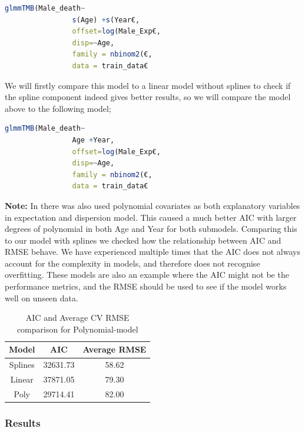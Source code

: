 \documentclass[12pt, twoside,hidelinks]{article}
\theoremstyle{definition}
\numberwithin{equation}{section}
\begin{document}
\begin{lstlisting}[language=R]
glmmTMB(Male_death~ 
                s(Age) +s(Year€,
                offset=log(Male_Exp€,
                disp=~Age,
                family = nbinom2(€, 
                data = train_data€
\end{lstlisting}

We will firstly compare this model to a linear model without splines to check if the spline component indeed gives better results, so we will compare the model above to the following model;

\begin{lstlisting}[language=R]
glmmTMB(Male_death~ 
                Age +Year,
                offset=log(Male_Exp€,
                disp=~Age,
                family = nbinom2(€, 
                data = train_data€
\end{lstlisting}


\textbf{Note:}  In  \citet{grindheim} there was also used polynomial covariates as both explanatory variables in expectation and dispersion model. This caused a much better AIC with larger degrees of polynomial in both Age and Year for both submodels. Comparing this to our model with splines we checked how the relationship between AIC and RMSE behave. We have experienced multiple times that the AIC does not always account for the complexity in models, and therefore does not recognise overfitting. These models are also an example where the AIC might not be the performance metrics, and the RMSE should be used to see if the model works well on unseen data. 

\begin{table}[H]
\centering
\begin{tabular}{|c|c|c|}
\hline
\textbf{Model} & \textbf{AIC} & \textbf{Average RMSE} \\
\hline
Splines & 32631.73 & 58.62 \\
Linear & 37871.05 & 79.30 \\
Poly & 29714.41 & 82.00 \\
\hline
\end{tabular}
\caption{AIC and Average CV RMSE comparison for Polynomial-model}
\label{table:models}
\end{table}



\subsubsection{Results}
\end{document}
